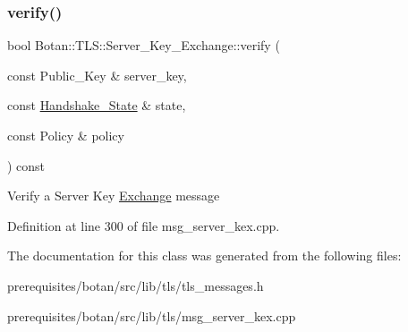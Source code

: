 \subsubsection{\texorpdfstring{verify()}{verify()}}
{\footnotesize\ttfamily bool Botan\+::\+T\+L\+S\+::\+Server\+\_\+\+Key\+\_\+\+Exchange\+::verify (\begin{DoxyParamCaption}\item[{const Public\+\_\+\+Key \&}]{server\+\_\+key,  }\item[{const \mbox{\hyperlink{class_botan_1_1_t_l_s_1_1_handshake___state}{Handshake\+\_\+\+State}} \&}]{state,  }\item[{const Policy \&}]{policy }\end{DoxyParamCaption}) const}

Verify a Server Key \mbox{\hyperlink{struct_exchange}{Exchange}} message 

Definition at line 300 of file msg\+\_\+server\+\_\+kex.\+cpp.



The documentation for this class was generated from the following files\+:\begin{DoxyCompactItemize}
\item 
prerequisites/botan/src/lib/tls/tls\+\_\+messages.\+h\item 
prerequisites/botan/src/lib/tls/msg\+\_\+server\+\_\+kex.\+cpp\end{DoxyCompactItemize}
